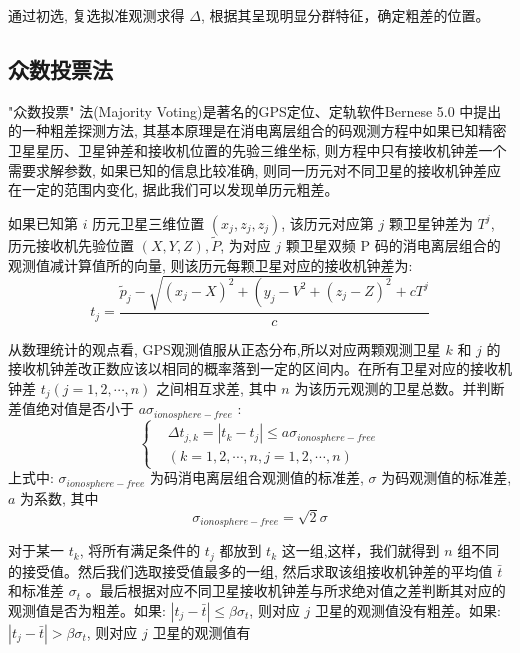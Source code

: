 \documentclass[12pt,hyperref,a4paper,UTF8]{ctexart}
\begin{document}
通过初选, 复选拟准观测求得 $\Delta$, 根据其呈现明显分群特征，确定粗差的位置。
\subsection{众数投票法}
"众数投票" 法(Majority Voting)是著名的GPS定位、定轨软件Bernese 5.0 中提出的一种粗差探测方法, 其基本原理是在消电离层组合的码观测方程中如果已知精密卫星星历、卫星钟差和接收机位置的先验三维坐标, 则方程中只有接收机钟差一个需要求解参数, 如果已知的信息比较准确, 则同一历元对不同卫星的接收机钟差应在一定的范围内变化, 据此我们可以发现单历元粗差。

如果已知第 $i$ 历元卫星三维位置 $\left(x_j, z_j, z_j\right)$, 该历元对应第 $j$ 颗卫星钟差为 $T^j$, 历元接收机先验位置 $(X, Y, Z), \widetilde{P}$, 为对应 $j$ 颗卫星双频 P 码的消电离层组合的观测值减计算值所的向量, 则该历元每颗卫星对应的接收机钟差为:
\begin{equation}
    t_j=\frac{\tilde{p}_j-\sqrt{\left(x_j-X\right)^2+\left(y_j-V^2+\left(z_j-Z\right)^2\right.}+c T^j}{c}
\end{equation}

从数理统计的观点看, GPS观测值服从正态分布,所以对应两颗观测卫星 $k$ 和 $j$ 的接收机钟差改正数应该以相同的概率落到一定的区间内。在所有卫星对应的接收机钟差 $t_j(j=1,2, \cdots, n)$ 之间相互求差, 其中 $n$ 为该历元观测的卫星总数。并判断差值绝对值是否小于 $a \sigma_{ionosphere-free}$ :
\begin{equation}
    \begin{cases}
        & \Delta t_{j, k}=\left|t_k-t_j\right| \leq a \sigma_{ionosphere-free } \\
        & (k=1,2, \cdots, n, j=1,2, \cdots, n)
    \end{cases}
\end{equation}
上式中: $\sigma_{ionosphere-free }$ 为码消电离层组合观测值的标准差, $\sigma$ 为码观测值的标准差, $a$ 为系数, 其中
\begin{equation}
    \sigma_{ionosphere-free }=\sqrt{2} \sigma
\end{equation}

对于某一 $t_k$, 将所有满足条件的 $t_j$ 都放到 $t_k$ 这一组,这样，我们就得到 $n$ 组不同的接受值。然后我们选取接受值最多的一组, 然后求取该组接收机钟差的平均值 $\bar{t}$ 和标准差 $\sigma_t$ 。最后根据对应不同卫星接收机钟差与所求绝对值之差判断其对应的观测值是否为粗差。如果: $\left|t_j-\bar{t}\right| \leq \beta \sigma_t$, 则对应 $j$ 卫星的观测值没有粗差。如果: $\left|t_j-\bar{t}\right|>\beta \sigma_t$, 则对应 $j$ 卫星的观测值有
\end{document}
